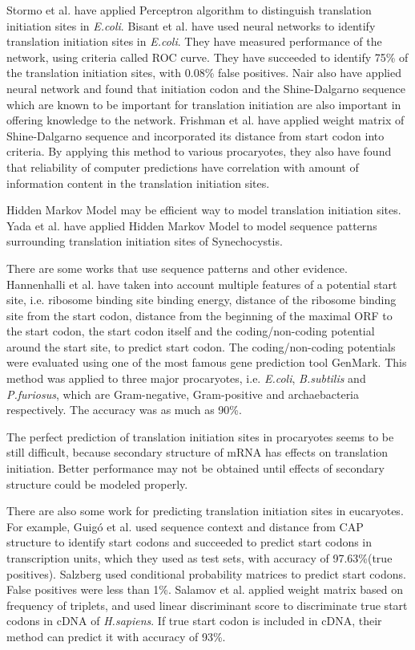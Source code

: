  Stormo et al.\cite{label800} have applied Perceptron algorithm to
distinguish translation initiation sites in {\it E.coli}.  Bisant et
al.\cite{label810} have used neural networks to identify translation
initiation sites in {\it E.coli}. They have measured performance of the
network, using criteria called ROC curve. They have succeeded to
identify 75\% of the translation initiation sites, with 0.08\% false
positives. Nair\cite{label905} also have applied neural network and
found that initiation codon and the Shine-Dalgarno sequence which are
known to be important for translation initiation are also important in
offering knowledge to the network. Frishman et al.\cite{label1005} have
applied weight matrix of Shine-Dalgarno sequence and incorporated its
distance from start codon into criteria. By applying this method to
various procaryotes, they also have found that reliability of computer
predictions have correlation with amount of information content in the
translation initiation sites.

Hidden Markov Model may be efficient way to model translation initiation
sites.  Yada et al.\cite{label515} have applied Hidden Markov Model to
model sequence patterns surrounding translation initiation sites of
Synechocystis.

There are some works that use sequence patterns and other
evidence. Hannenhalli et al.\cite{label921} have taken into account
multiple features of a potential start site, i.e. ribosome binding site
binding energy, distance of the ribosome binding site from the start
codon, distance from the beginning of the maximal ORF to the start
codon, the start codon itself and the coding/non-coding potential around
the start site, to predict start codon. The coding/non-coding potentials
were evaluated using one of the most famous gene prediction tool
GenMark\cite{label993}. This method was applied to three major
procaryotes, i.e. {\it E.coli}, {\it B.subtilis} and {\it P.furiosus},
which are Gram-negative, Gram-positive and archaebacteria
respectively. The accuracy was as much as 90\%.

The perfect prediction of translation initiation sites in procaryotes
seems to be still difficult, because secondary structure of mRNA has
effects on translation initiation. Better performance may not be
obtained until effects of secondary structure could be modeled
properly\cite{label810}.

There are also some work for predicting translation initiation sites in
eucaryotes. For example, Guig\'o et al.\cite{label7008} used sequence
context and distance from CAP structure to identify start codons and
succeeded to predict start codons in transcription units, which they
used as test sets, with accuracy of 97.63\%(true positives).
Salzberg\cite{label7765} used conditional probability matrices to
predict start codons. False positives were less than 1\%. Salamov et
al.\cite{lnis1} applied weight matrix based on frequency of triplets,
and used linear discriminant score to discriminate true start codons in
cDNA of {\it H.sapiens}. If true start codon is included in cDNA, their
method can predict it with accuracy of 93\%.



